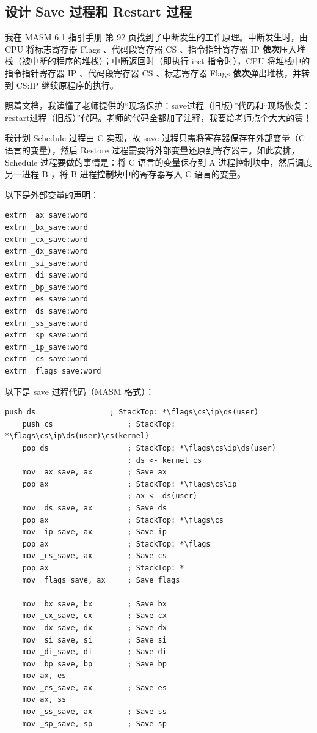\documentclass{article}
\begin{document}
\subsection{设计 Save 过程和 Restart 过程}

我在 MASM 6.1 指引手册 第 92 页找到了中断发生的工作原理。中断发生时，由 CPU 将标志寄存器 Flags 、代码段寄存器 CS 、指令指针寄存器 IP \textbf{依次}压入堆栈（被中断的程序的堆栈）；中断返回时（即执行 iret 指令时），CPU 将堆栈中的指令指针寄存器 IP 、代码段寄存器 CS 、标志寄存器 Flags \textbf{依次}弹出堆栈，并转到 CS:IP 继续原程序的执行。

照着文档，我读懂了老师提供的“现场保护：save过程（旧版）”代码和“现场恢复：restart过程（旧版）”代码。老师的代码全都加了注释，我要给老师点个大大的赞！

我计划 Schedule 过程由 C 实现，故 save 过程只需将寄存器保存在外部变量（C 语言的变量），然后 Restore 过程需要将外部变量还原到寄存器中。如此安排，Schedule 过程要做的事情是：将 C 语言的变量保存到 A 进程控制块中，然后调度另一进程 B ，将 B 进程控制块中的寄存器写入 C 语言的变量。

以下是外部变量的声明：

\begin{lstlisting}[language={[x86masm]Assembler}]
extrn _ax_save:word
extrn _bx_save:word
extrn _cx_save:word
extrn _dx_save:word
extrn _si_save:word
extrn _di_save:word
extrn _bp_save:word
extrn _es_save:word
extrn _ds_save:word
extrn _ss_save:word
extrn _sp_save:word
extrn _ip_save:word
extrn _cs_save:word
extrn _flags_save:word
\end{lstlisting}

以下是 save 过程代码（MASM 格式）：

\begin{lstlisting}[language={[x86masm]Assembler}]
	push ds					; StackTop: *\flags\cs\ip\ds(user)
	push cs					; StackTop: *\flags\cs\ip\ds(user)\cs(kernel)
	pop ds					; StackTop: *\flags\cs\ip\ds(user)
							; ds <- kernel cs
	mov _ax_save, ax		; Save ax
	pop ax					; StackTop: *\flags\cs\ip
							; ax <- ds(user)
	mov _ds_save, ax		; Save ds
	pop ax					; StackTop: *\flags\cs
	mov _ip_save, ax		; Save ip
	pop ax					; StackTop: *\flags
	mov _cs_save, ax		; Save cs
	pop ax					; StackTop: *
	mov _flags_save, ax		; Save flags
	
	mov _bx_save, bx		; Save bx
	mov _cx_save, cx		; Save cx
	mov _dx_save, dx		; Save dx
	mov _si_save, si		; Save si
	mov _di_save, di		; Save di
	mov _bp_save, bp		; Save bp
	mov ax, es
	mov _es_save, ax		; Save es
	mov ax, ss
	mov _ss_save, ax		; Save ss
	mov _sp_save, sp		; Save sp
\end{lstlisting}
\end{document}
